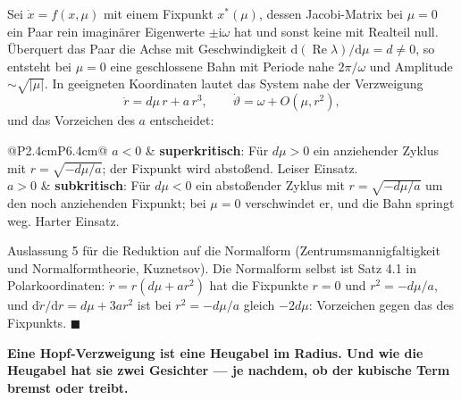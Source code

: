 \begin{merksatz}
Sei $\dot x = f(x,\mu)$ mit einem Fixpunkt $x^{*}(\mu)$, dessen Jacobi-Matrix bei $\mu = 0$ ein Paar rein imaginärer Eigenwerte $\pm\mathrm i\omega$ hat und sonst keine mit Realteil null. Überquert das Paar die Achse mit Geschwindigkeit $\mathrm d(\operatorname{Re}\lambda)/\mathrm d\mu = d \ne 0$, so entsteht bei $\mu = 0$ eine geschlossene Bahn mit Periode nahe $2\pi/\omega$ und Amplitude $\sim\sqrt{|\mu|}$. In geeigneten Koordinaten lautet das System nahe der Verzweigung
\[ \dot r = d\mu\,r + a\,r^{3}, \qquad \dot\vartheta = \omega + O(\mu, r^{2}) , \]
und das Vorzeichen des  $a$ entscheidet:
\begin{center}
{\small
\renewcommand{\arraystretch}{1.5}
\begin{tabular}{@{}P{2.4cm}P{6.4cm}@{}}
\toprule
$a < 0$ & \textbf{superkritisch}: Für $d\mu > 0$ ein anziehender Zyklus mit $r = \sqrt{-d\mu/a}$; der Fixpunkt wird abstoßend. Leiser Einsatz.\\
$a > 0$ & \textbf{subkritisch}: Für $d\mu < 0$ ein abstoßender Zyklus mit $r = \sqrt{-d\mu/a}$ um den noch anziehenden Fixpunkt; bei $\mu = 0$ verschwindet er, und die Bahn springt weg. Harter Einsatz.\\
\bottomrule
\end{tabular}}
\end{center}

Auslassung 5 für die Reduktion auf die Normalform (Zentrumsmannigfaltigkeit und Normalformtheorie, Kuznetsov). Die Normalform selbst ist Satz 4.1 in Polarkoordinaten: $\dot r = r(d\mu + ar^{2})$ hat die Fixpunkte $r = 0$ und $r^{2} = -d\mu/a$, und $\mathrm d\dot r/\mathrm dr = d\mu + 3ar^{2}$ ist bei $r^{2} = -d\mu/a$ gleich $-2d\mu$: Vorzeichen gegen das des Fixpunkts. $\blacksquare$

\begin{center}
\begin{minipage}{0.9\textwidth}
\textbf{Eine Hopf-Verzweigung ist eine Heugabel im Radius. Und wie die Heugabel hat sie zwei Gesichter --- je nachdem, ob der kubische Term bremst oder treibt.}
\end{minipage}
\end{center}
\end{merksatz}

